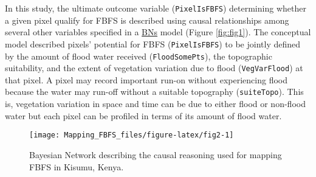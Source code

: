 \documentclass[12pt,oneside]{article}
\begin{document}
In this study, the ultimate outcome variable (\texttt{PixelIsFBFS}) determining whether a given pixel qualify for FBFS is described using causal relationships among several other variables specified in a \href{https://en.wikipedia.org/wiki/Bayesian_network}{BNs} model (Figure \ref{fig:fig1}). The conceptual model described pixels' potential for FBFS (\texttt{PixelIsFBFS}) to be jointly defined by the amount of flood water received (\texttt{FloodSomePts}), the topographic suitability, and the extent of vegetation variation due to flood (\texttt{VegVarFlood}) at that pixel. A pixel may record important run-on without experiencing flood because the water may run-off without a suitable topography (\texttt{suiteTopo}). This is, vegetation variation in space and time can be due to either flood or non-flood water but each pixel can be profiled in terms of its amount of flood water.

\begin{figure}[!htbp]

{\centering \texttt{[image: Mapping\_FBFS\_files/figure-latex/fig2-1]} 

}

\caption{Bayesian Network describing the causal reasoning used for mapping FBFS in Kisumu, Kenya.}\label{fig:fig2}
\end{figure}

\begin{table}[t]

\caption{\label{tab:table1}List of normalized difference spectral indices (NDSI) used for mapping FBFS in Kisumu County, Kenya.}
\centering
{}
\end{table}
\end{document}

